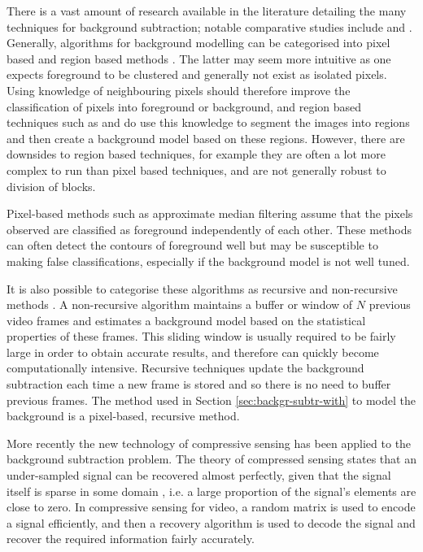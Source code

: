 There is a vast amount of research available  in the literature detailing the many techniques for background subtraction; notable comparative studies include \cite{Sen-Ching2004} and \cite{Piccardi2004a}. Generally, algorithms for background modelling  can be categorised into pixel based and region based methods  \citep{Bouwmans2011}. The latter may seem more intuitive as one expects foreground to be clustered and generally not exist as isolated pixels. Using knowledge of neighbouring pixels should therefore improve the classification of pixels into foreground or background, and region based techniques such as  \cite{elgammal2000} and \cite{toyama1999} do use this knowledge to segment the images into regions and then create a background model based on these regions. However, there are downsides to region based techniques, for example they are often a lot more complex to run than pixel based techniques, and are not generally robust to division of blocks.

Pixel-based methods such as approximate median filtering \citep{McFarlane1995} assume that the pixels observed are classified as foreground independently of each other. These methods can often detect the contours of foreground well but may be susceptible to making false classifications, especially if the background model is not well tuned.  

It is also possible to categorise these algorithms as recursive and non-recursive methods \citep{Bouwmans2011}. A non-recursive algorithm maintains a buffer or window of $N$ previous video frames and estimates a background model based on the statistical properties of these frames. This sliding window is usually required to be fairly large in order to obtain accurate results, and therefore can quickly become computationally intensive. Recursive techniques update the background subtraction each time a new frame is stored and so there is no need to buffer previous frames. The method used in Section \ref{sec:backgr-subtr-with} to model the background is a pixel-based, recursive method.

More recently the new technology of compressive sensing \citep{Candes2006, Candes2006a, Donoho2006} has been applied to the background subtraction problem. The theory of compressed sensing states that an under-sampled signal can be recovered almost perfectly, given that the signal itself is sparse in some domain \citep{Baraniuk2007}, i.e. a large proportion of the signal's elements are close to zero. In compressive sensing for video, a random matrix is used to encode a signal efficiently, and then a recovery algorithm is used to decode the signal and recover the required information fairly accurately. 

